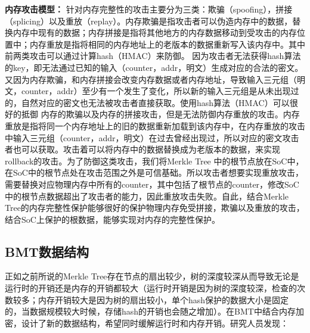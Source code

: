 \textbf{内存攻击模型：}
针对内存完整性的攻击主要分为三类：欺骗（spoofing），拼接（splicing）以及重放（replay）。内存欺骗是指攻击者可以伪造内存中的数据，替换内存中现有的数据；内存拼接是指将其他地方的内存数据移动到受攻击的内存位置中；内存重放是指将相同的内存地址上的老版本的数据重新写入该内存中。其中前两类攻击可以通过计算hash（HMAC）来防御。
因为攻击者无法获得hash算法的key，即无法通过已知的输入（counter，addr，明文）生成对应的合法的密文。又因为内存欺骗，和内存拼接会改变内存数据或者内存地址，导致输入三元组（明文，counter，addr）至少有一个发生了变化，所以新的输入三元组是从未出现过的，自然对应的密文也无法被攻击者直接获取。使用hash算法（HMAC）可以很好的抵御
内存的欺骗以及内存的拼接攻击，但是无法防御内存重放的攻击。内存重放是指将同一个内存地址上的旧的数据重新加载到该内存中，在内存重放的攻击中输入三元组（counter，addr，明文）在过去曾经出现过，所以对应的密文攻击者也可以获取。攻击着可以将内存中的数据替换成为老版本的数据，来实现rollback的攻击。为了防御这类攻击，我们将Merkle Tree
中的根节点放在SoC中，在SoC中的根节点处在攻击范围之外是可信基础。所以攻击者想要实现重放攻击，需要替换对应物理内存中所有的counter，其中包括了根节点的counter，修改SoC中的根节点数据超出了攻击者的能力，因此重放攻击失败。自此，结合Merkle Tree的内存完整性保护能够很好的保护物理内存免受拼接，欺骗以及重放的攻击，结合SoC上保护的根数据，能够实现对内存的完整性保护。

\subsection{BMT数据结构}
正如之前所说的Merkle Tree存在节点的扇出较少，树的深度较深从而导致无论是运行时的开销还是内存的开销都较大（运行时开销是因为树的深度较深，检查的次数较多；内存开销较大是因为树的扇出较小，单个hash保护的数据大小是固定的，当数据规模较大时候，存储hash的开销也会随之增加）。在BMT中结合内存加密，设计了新的数据结构，希望同时缓解运行时和内存开销。研究人员发现：

